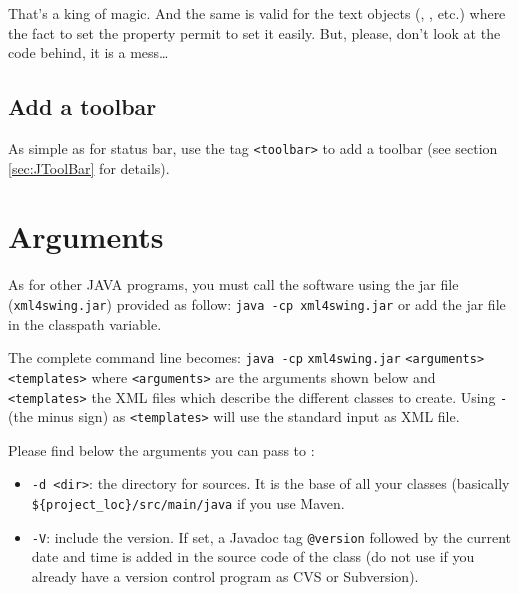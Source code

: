 That's a king of magic. And the same is valid for the text objects
(, , etc.) where the fact to set
the property permit to set it easily. But, please, don't look at the code
behind, it is a mess\ldots


\subsection{Add a toolbar}
As simple as for status bar, use the tag \verb|<toolbar>|
to add a toolbar (see section \ref{sec:JToolBar} for details).

\section{\label{sec:args}Arguments}
As for other JAVA programs, you must call the software using
the jar file (\verb|xml4swing.jar|) provided as follow:
\verb|java -cp xml4swing.jar| or add the jar file in the classpath
variable.

The complete command line becomes:
\verb|java -cp| \verb|xml4swing.jar| \verb|<arguments>| \verb|<templates>| where \verb|<arguments>| are the arguments shown below
and \verb|<templates>| the XML files which describe the different classes
to create. Using \verb|-| (the minus sign) as \verb|<templates>| will
use the standard input as XML file.


Please find below the arguments you can pass to \xmlswing:
\begin{itemize}
  \item \verb|-d <dir>|: the directory for sources. It is the base
  		of all your classes (basically \verb|${project_loc}/src/main/java|
  		if you use Maven.
  \item \verb|-V|: include the version. If set, a Javadoc tag
      \verb|@version| followed by the current date and time is added 
      in the source code of the class (do not use if you already have 
      a version control program as CVS or Subversion).
\end{itemize}

